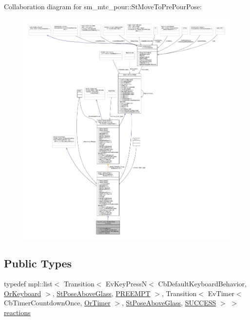Collaboration diagram for sm\+\_\+mtc\+\_\+pour\+:\+:St\+Move\+To\+Pre\+Pour\+Pose\+:
\nopagebreak
\begin{figure}[H]
\begin{center}
\leavevmode
\includegraphics[width=350pt]{structsm__mtc__pour_1_1StMoveToPrePourPose__coll__graph}
\end{center}
\end{figure}
\subsection*{Public Types}
\begin{DoxyCompactItemize}
\item 
typedef mpl\+::list$<$ Transition$<$ Ev\+Key\+PressN$<$ Cb\+Default\+Keyboard\+Behavior, \hyperlink{classsm__mtc__pour_1_1OrKeyboard}{Or\+Keyboard} $>$, \hyperlink{structsm__mtc__pour_1_1StPoseAboveGlass}{St\+Pose\+Above\+Glass}, \hyperlink{classPREEMPT}{P\+R\+E\+E\+M\+PT} $>$, Transition$<$ Ev\+Timer$<$ Cb\+Timer\+Countdown\+Once, \hyperlink{classsm__mtc__pour_1_1OrTimer}{Or\+Timer} $>$, \hyperlink{structsm__mtc__pour_1_1StPoseAboveGlass}{St\+Pose\+Above\+Glass}, \hyperlink{classSUCCESS}{S\+U\+C\+C\+E\+SS} $>$ $>$ \hyperlink{structsm__mtc__pour_1_1StMoveToPrePourPose_a2bb0dd2b99dd3c367f0d7a731647ebb3}{reactions}
\end{DoxyCompactItemize}
